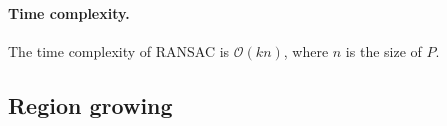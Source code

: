 \paragraph{Time complexity.} The time complexity of RANSAC is $\mathcal{O}(kn)$, where $n$ is the size of $P$.



\subsection{Region growing}%
\label{sec:regiongrowing}%


